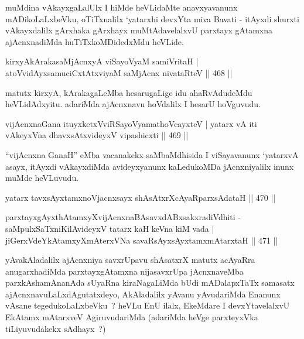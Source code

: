 \begin{artha}
muMdina vAkayxgaLalUlx I hiMde heVLidaMte anavxyavanunx
mADikoLaLxbeVku, oTiTxnalilx `yatarxhi devxYta miva Bavati - itAyxdi
shurxti vAkayxdalilx gArxhaka gArxhayx muMtAdavelalxvU parxtayx
gAtamxna ajAcnxnadiMda huTiTxkoMDidedxMdu heVLide.
\end{artha}

\begin{shl}
kirxyAkArakasaMjAcnxyA viSayoV\s yaM samiVritaH |
atoV\s vidAyxsamuciCxtAtxviyaM saMjAcnx nivataRteV \hfill || 468 ||
\end{shl}

\begin{artha}
matutx kirxyA, kArakagaLeMba hesarugaLige idu ahaRvAdudeMdu\break
heVLidAdxyitu. adariMda ajAcnxnavu hoVdalilx I hesarU hoVguvudu.
\end{artha}


\begin{shl}
vijAcnxnaGana ituyxketxVviRSayoV\s yamathoVcayxteV |
yatarx vA iti vAkeyxVna dhavxsAtxvideyxV vipashicxti \hfill || 469 ||
\end{shl}

\begin{artha}
``vijAcnxna GanaH'' eMba vacanakekx saMbaMdhisida I viSayavanunx
 `yatarxvA asayx, itAyxdi vAkayxdiMda avideyxyanunx kaLedukoMDa
 jAcnxniyalilx inunx muMde heVLuvudu. 
\end{artha}


\begin{shl}
yatarx tavxsAyx\s \s tamxnoV\s jacnxsayx shAsAtxrXcAyaRparxsAdataH \hfill || 470 ||
\end{shl}
\begin{shl}
parxtayxgAyxthAtamxyXvijAcnxnaBAsavxdABxsakxradiVdhiti -
saMpulxSaTxniKilAvideyxV tatarx kaH keVna kiM vada |
jiGerxVdeYkAtamxyXmAterxVNa savaRsAyxsAyx\s \s tamxmAtarxtaH \hfill || 471 ||
\end{shl}

\begin{artha}
yAvakAladalilx ajAcnxniya savxrUpavu shAsatxrX matutx acAyaRra
anugarxhadiMda parxtayxgAtamxna nijasavxrUpa jAcnxnaveMba
parxkAshamAnanAda sUyaRna kiraNagaLiMda bUdi mADalapxTaTx samasatx
ajAcnxnavuLaLxdAgutatxdeyo, AkAladalilx yAvanu yAvudariMda Enanunx
vAsane tegedukoLaLxbeVku~? heVLu EnU ilalx, EkeMdare I devxYtavelalxvU
EkAtamx mAtarxveV AgiruvudariMda (adariMda heVge parxteyxVka
tiLiyuvudakekx sAdhayx~?)
\end{artha}

